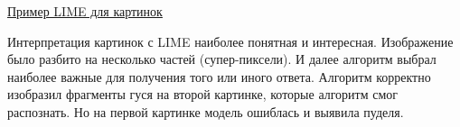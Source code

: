 \underline{Пример LIME для картинок} \cite{lime_dop}
\vspace{-3mm}

\begin{figure}[h]
\end{figure}

Интерпретация картинок с LIME наиболее понятная и интересная. Изображение было разбито на несколько частей (супер-пиксели). И далее алгоритм выбрал наиболее важные для получения того или иного ответа. Алгоритм корректно изобразил фрагменты гуся на второй картинке, которые алгоритм смог распознать. Но на первой картинке модель ошиблась и выявила пуделя.